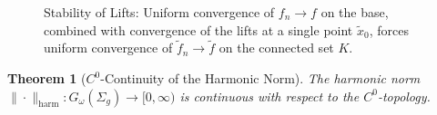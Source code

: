 \documentclass[11pt]{article}
\newtheorem{theorem}{Theorem}[section]
\theoremstyle{definition}
\begin{document}
\begin{figure}[htbp]
		\tiny{	\caption{Stability of Lifts: Uniform convergence of $f_n \to f$ on the base, combined with convergence of the lifts at a single point $\tilde{x}_0$, forces uniform convergence of $\widetilde{f}_n \to \widetilde{f}$ on the connected set $K$.}}
	\end{figure}
	
	
	\begin{theorem}[$C^0$-Continuity of the Harmonic Norm]
		\label{thm:C0continuity}
		The harmonic norm $\|\cdot\|_{\mathrm{harm}}: G_\omega(\Sigma_g) \longrightarrow
		[0,\infty)$ is continuous with respect to the $C^0$-topology.
	\end{theorem}
	
\end{document}
